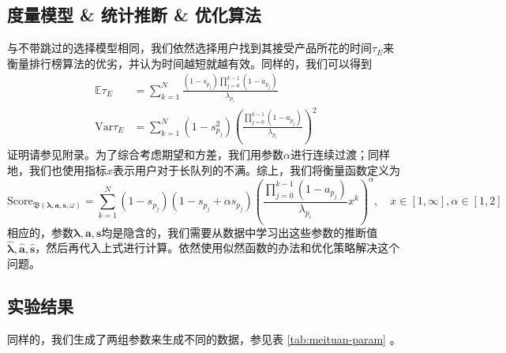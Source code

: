 \documentclass[UTF8]{ctexart}
\theoremstyle{plain}
\theoremstyle{definition}
\theoremstyle{remark}
\begin{document}
	\subsection{度量模型 \& 统计推断 \& 优化算法}
	与不带跳过的选择模型相同，我们依然选择用户找到其接受产品所花的时间$\tau_E$来衡量排行榜算法的优劣，并认为时间越短就越有效。同样的，我们可以得到
	\begin{equation} \label{EQ_B}
	\begin{aligned}
	\mathbb{E} \tau_E & = \sum_{k=1}^N \frac{(1-s_{p_j})\prod\limits_{j=0}^{k-1}(1-a_{p_j})}{\lambda_{p_i}} \\
	\mathrm{Var} \tau_E & = \sum_{k=1}^N (1-s_{p_j}^2)\left(\frac{\prod\limits_{j=0}^{k-1}(1-a_{p_j})}{\lambda_{p_i}}\right)^2
	\end{aligned}
	\end{equation}
	证明请参见附录。为了综合考虑期望和方差，我们用参数$\alpha$进行连续过渡；同样地，我们也使用指标$x$表示用户对于长队列的不满。综上，我们将衡量函数定义为
	\begin{equation}
	\mathrm{Score}_{\mathfrak{B}\left(\bm{\lambda}, \bm{a}, \bm{s}, \omega\right)} = \sum_{k=1}^N (1-s_{p_j})(1-s_{p_j}+\alpha s_{p_j})\left(\frac{\prod\limits_{j=0}^{k-1}(1-a_{p_j})}{\lambda_{p_i}} x^k\right)^\alpha, \quad x \in [1, \infty], \alpha \in [1, 2]
	\end{equation}
	相应的，参数$\bm{\lambda}, \bm{a}, \bm{s}$均是隐含的，我们需要从数据中学习出这些参数的推断值$\bm{\hat{\lambda}}, \bm{\hat{a}}, \bm{\hat{s}}$，然后再代入上式进行计算。依然使用似然函数的办法和优化策略解决这个问题。
	\subsection{实验结果}
	同样的，我们生成了两组参数来生成不同的数据，参见表 \ref{tab:meituan-param} 。
	
\end{document}
